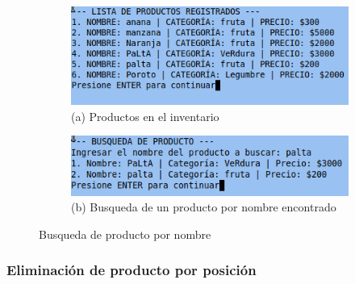 \documentclass[12pt]{article}
\begin{document}
\begin{figure}[H]
    \centering

    \begin{subfigure}[b]{0.6\textwidth}
        \centering
        \includegraphics[width=\textwidth]{Imagenes/img10.png}
        \caption*{(a) Productos en el inventario}
    \end{subfigure}
    \hfill
    \begin{subfigure}[b]{0.6\textwidth}
        \centering
        \includegraphics[width=\textwidth]{Imagenes/img11.png}
        \caption*{(b) Busqueda de un producto por nombre encontrado}
    \end{subfigure}

    \caption{Busqueda de producto por  nombre}
    \label{fig:busqueda de producto}
\end{figure}

\subsubsection{Eliminación de producto por posición}
\end{document}
